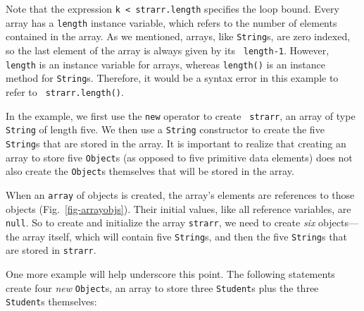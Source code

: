 \noindent Note that the expression \verb|k < strarr.length| specifies
the loop bound.  Every array has a {\tt length}
instance variable, which refers to the number of elements contained in
the array.  As we mentioned, arrays, like {\tt String}s, are zero
indexed, so the last element of the array is always given by its {\tt
length-1}.  However, {\tt length} is an instance variable for arrays,
whereas {\tt length()} is an instance method for {\tt String}s.
Therefore, it would be a syntax error in this example to refer to {\tt
strarr.length()}.


In the example, we first use the {\tt new} operator to create {\tt
strarr}, an array of type {\tt String} of length five.  We then use a
{\tt String} constructor to create the five {\tt String}s that are
stored in the array.  It is important to realize that creating an
array to store five {\tt Object}s (as opposed to five primitive data
elements) does not also create the {\tt Object}s themselves that will
be stored in the array.

When an {\tt array} of objects is created, the array's elements are
references to those objects (Fig.~\ref{fig-arrayobjs}). Their initial
values, like all reference variables, are {\tt null}.  So to create
and initialize the array {\tt strarr}, we need to create {\it six}
objects---the array itself, which will contain five {\tt String}s, and
then the five {\tt String}s that are stored in {\tt strarr}.

\begin{figure}[tb]
\end{figure}

One more example will help underscore this point.   The following
statements create four {\it new} {\tt Object}s, an array to store
three {\tt Student}s plus the three {\tt Student}s themselves:

